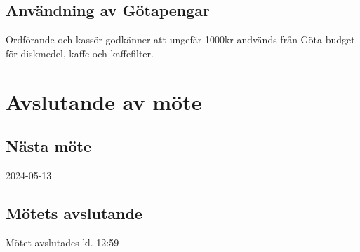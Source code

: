 \documentclass[protokoll]{dvd}
\begin{document}
\subsection*{Användning av Götapengar}
Ordförande och kassör godkänner att ungefär 1000kr andvänds från Göta-budget för diskmedel, kaffe och kaffefilter.

\newpage
\section{Avslutande av möte}

\subsection{Nästa möte} 
2024-05-13

\subsection{Mötets avslutande}
Mötet avslutades kl. 12:59

\styrelsesignaturer
\end{document}
